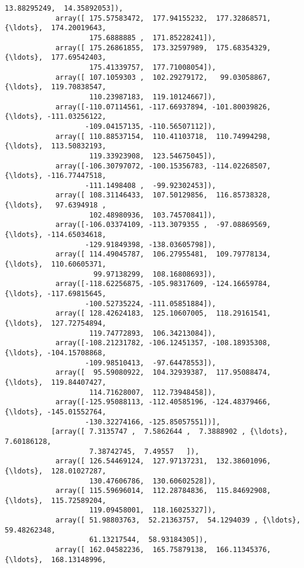 \documentclass[11pt]{article}
\begin{document}
\begin{Verbatim}[commandchars=\\\{\}]
                    13.88295249,  14.35892053]),
            array([ 175.57583472,  177.94155232,  177.32868571, {\ldots},  174.20019643,
                    175.6888885 ,  171.85228241]),
            array([ 175.26861855,  173.32597989,  175.68354329, {\ldots},  177.69542403,
                    175.41339757,  177.71008054]),
            array([ 107.1059303 ,  102.29279172,   99.03058867, {\ldots},  119.70838547,
                    110.23987183,  119.10124667]),
            array([-110.07114561, -117.66937894, -101.80039826, {\ldots}, -111.03256122,
                   -109.04157135, -110.56507112]),
            array([ 110.88537154,  110.41103718,  110.74994298, {\ldots},  113.50832193,
                    119.33923908,  123.54675045]),
            array([-106.30797072, -100.15356783, -114.02268507, {\ldots}, -116.77447518,
                   -111.1498408 ,  -99.92302453]),
            array([ 108.31146433,  107.50129856,  116.85738328, {\ldots},   97.6394918 ,
                    102.48980936,  103.74570841]),
            array([-106.03374109, -113.3079355 ,  -97.08869569, {\ldots}, -114.65034618,
                   -129.91849398, -138.03605798]),
            array([ 114.49045787,  106.27955481,  109.79778134, {\ldots},  110.60605371,
                     99.97138299,  108.16808693]),
            array([-118.62256875, -105.98317609, -124.16659784, {\ldots}, -117.69815645,
                   -100.52735224, -111.05851884]),
            array([ 128.42624183,  125.10607005,  118.29161541, {\ldots},  127.72754894,
                    119.74772893,  106.34213084]),
            array([-108.21231782, -106.12451357, -108.18935308, {\ldots}, -104.15708868,
                   -109.98510413,  -97.64478553]),
            array([  95.59080922,  104.32939387,  117.95088474, {\ldots},  119.84407427,
                    114.71628007,  112.73948458]),
            array([-125.95088113, -112.40585196, -124.48379466, {\ldots}, -145.01552764,
                   -130.32274166, -125.85057551])],
           [array([ 7.3135747 ,  7.5862644 ,  7.3888902 , {\ldots},  7.60186128,
                    7.38742745,  7.49557   ]),
            array([ 126.54469124,  127.97137231,  132.38601096, {\ldots},  128.01027287,
                    130.47606786,  130.60602528]),
            array([ 115.59696014,  112.28784836,  115.84692908, {\ldots},  115.72589204,
                    119.09458001,  118.16025327]),
            array([ 51.98803763,  52.21363757,  54.1294039 , {\ldots},  59.48262348,
                    61.13217544,  58.93184305]),
            array([ 162.04582236,  165.75879138,  166.11345376, {\ldots},  168.13148996,

\end{Verbatim}
\end{document}
